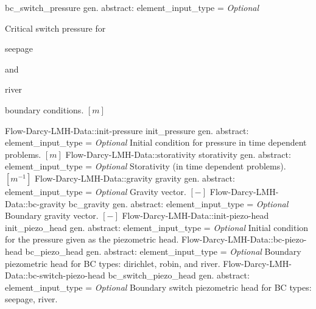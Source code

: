 \begin{RecordType}
			{bc{\_}switch{\_}pressure}
			{{gen. abstract: }}{{element{\_}input{\_}type}{ = }}
			{ \it{Optional}}
			{{{Critical switch pressure for }\begin{ttfamily}seepage\end{ttfamily}{ and }\begin{ttfamily}river\end{ttfamily}{ boundary conditions. }{$[m]$}%
}}
		\RecKey
			{Flow-Darcy-LMH-Data::init-pressure}
			{init{\_}pressure}
			{{gen. abstract: }}{{element{\_}input{\_}type}{ = }}
			{ \it{Optional}}
			{{{Initial condition for pressure in time dependent problems. }{$[m]$}%
}}
		\RecKey
			{Flow-Darcy-LMH-Data::storativity}
			{storativity}
			{{gen. abstract: }}{{element{\_}input{\_}type}{ = }}
			{ \it{Optional}}
			{{{Storativity (in time dependent problems). }{$[m^{-1}]$}%
}}
		\RecKey
			{Flow-Darcy-LMH-Data::gravity}
			{gravity}
			{{gen. abstract: }}{{element{\_}input{\_}type}{ = }}
			{ \it{Optional}}
			{{{Gravity vector. }{$[-]$}%
}}
		\RecKey
			{Flow-Darcy-LMH-Data::bc-gravity}
			{bc{\_}gravity}
			{{gen. abstract: }}{{element{\_}input{\_}type}{ = }}
			{ \it{Optional}}
			{{{Boundary gravity vector. }{$[-]$}%
}}
		\RecKey
			{Flow-Darcy-LMH-Data::init-piezo-head}
			{init{\_}piezo{\_}head}
			{{gen. abstract: }}{{element{\_}input{\_}type}{ = }}
			{ \it{Optional}}
			{{{Initial condition for the pressure given as the piezometric head.}%
}}
		\RecKey
			{Flow-Darcy-LMH-Data::bc-piezo-head}
			{bc{\_}piezo{\_}head}
			{{gen. abstract: }}{{element{\_}input{\_}type}{ = }}
			{ \it{Optional}}
			{{{Boundary piezometric head for BC types: dirichlet, robin, and river.}%
}}
		\RecKey
			{Flow-Darcy-LMH-Data::bc-switch-piezo-head}
			{bc{\_}switch{\_}piezo{\_}head}
			{{gen. abstract: }}{{element{\_}input{\_}type}{ = }}
			{ \it{Optional}}
			{{{Boundary switch piezometric head for BC types: seepage, river.}%
}}
\end{RecordType}
